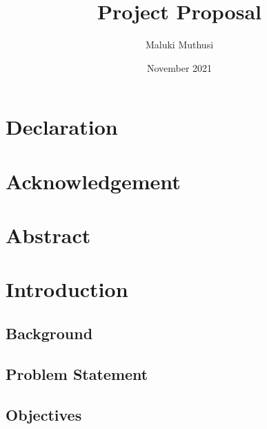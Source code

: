 \documentclass{report}
\title{Project Proposal}
\author{Maluki Muthusi}
\date{November 2021}
\begin{document}


\section{Declaration}

\newpage

\section{Acknowledgement}

\newpage

\section{Abstract}

\newpage


% 




\section{Introduction}


\subsection{Background}


\subsection{Problem Statement}


\subsection{Objectives}

\end{document}
